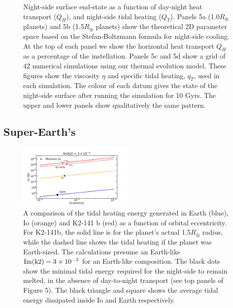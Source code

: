 \documentclass[fleqn,usenatbib]{mnras}
\begin{document}
\begin{figure}
\caption{Night-side surface end-state as a function of day-night heat transport ($Q_{H}$), and night-side tidal heating ($Q_{T}$). Panels 5a (1.0$R_{\oplus}$ planets) and 5b (1.5$R_{\oplus}$ planets) show the theoretical 2D parameter space based on the Stefan-Boltzmann formula for night-side cooling. At the top of each panel we show the horizontal heat transport $Q_{H}$ as a percentage of the instellation. Panels 5c and 5d show a grid of 42 numerical simulations using our thermal evolution model. These figures show the viscosity $\eta$ and specific tidal heating, $q_{T}$, used in each simulation. The colour of each datum gives the state of the night-side surface after running the simulation for 10 Gyrs. The upper and lower panels show qualitatively the same pattern.}
\label{fig5}
\end{figure}



\subsection{Super-Earth's}   \label{sec3.2}


\begin{figure}\centering
\includegraphics[width=0.5\textwidth]{6a.jpg}



\caption{A comparison of the tidal heating energy generated in Earth (blue), Io (orange) and K2-141 b (red) as a function of orbital eccentricity. For K2-141b, the solid line is for the planet's actual 1.5$R_{\oplus}$ radius, while the dashed line shows the tidal heating if the planet was Earth-sized. The calculations presume an Earth-like $\rm{Im}(k2) = 3 \times 10^{-3}$ for an Earth-like composition. The black dots show the minimal tidal energy required for the night-side to remain melted, in the absence of day-to-night transport (see top panels of Figure 5). The black triangle and square shows the average tidal energy dissipated inside Io and Earth respectively.}
\label{fig6}
\end{figure}
\end{document}

